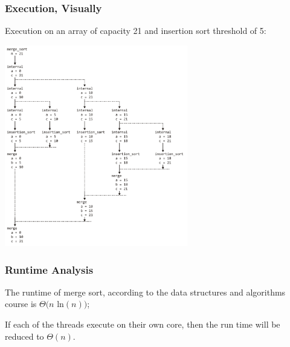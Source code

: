 \begin{frame}
\frametitle{Execution, Visually}

Execution on an array of capacity 21 and insertion sort threshold of 5:

\begin{center}
	\includegraphics[width=0.6\textwidth]{images/merge-sort-execution.png}
\end{center}
\end{frame}

\begin{frame}
\frametitle{Runtime Analysis}


The runtime of merge sort, according to the data structures and algorithms course is $\Theta(n$ ln$(n))$;

If each of the threads execute on their own core, then the run time will be reduced to $\Theta(n)$.

\end{frame}





